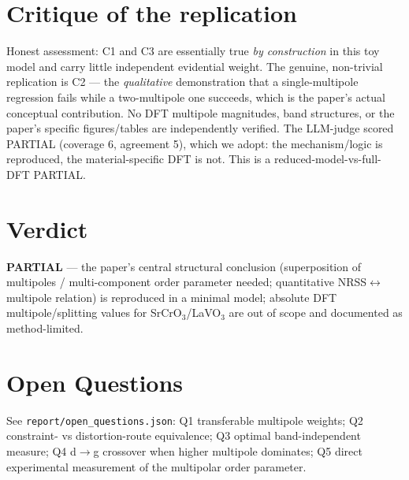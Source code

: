 \documentclass[11pt]{article}
\begin{document}
\section{Critique of the replication}
Honest assessment: C1 and C3 are essentially true \emph{by construction} in this toy model and
carry little independent evidential weight. The genuine, non-trivial replication is C2 --- the
\emph{qualitative} demonstration that a single-multipole regression fails while a two-multipole one
succeeds, which is the paper's actual conceptual contribution. No DFT multipole magnitudes,
band structures, or the paper's specific figures/tables are independently verified. The LLM-judge
scored PARTIAL (coverage 6, agreement 5), which we adopt: the mechanism/logic is reproduced, the
material-specific DFT is not. This is a reduced-model-vs-full-DFT PARTIAL.

\section{Verdict}
\textbf{PARTIAL} --- the paper's central structural conclusion (superposition of multipoles /
multi-component order parameter needed; quantitative NRSS$\leftrightarrow$multipole relation) is
reproduced in a minimal model; absolute DFT multipole/splitting values for SrCrO$_3$/LaVO$_3$ are
out of scope and documented as method-limited.

\section*{Open Questions}
See \texttt{report/open\_questions.json}: Q1 transferable multipole weights; Q2 constraint- vs
distortion-route equivalence; Q3 optimal band-independent measure; Q4 d$\to$g crossover when higher
multipole dominates; Q5 direct experimental measurement of the multipolar order parameter.
\end{document}
